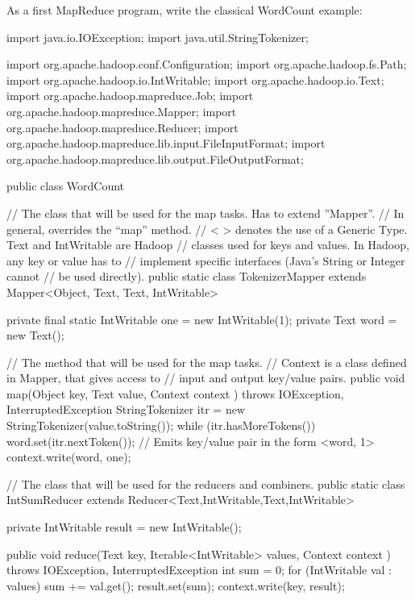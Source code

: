 \documentclass[11pt]{article}
\begin{document}
As a first MapReduce program, write the classical WordCount example:
\begin{java}
  import java.io.IOException;
  import java.util.StringTokenizer;
  
  import org.apache.hadoop.conf.Configuration;
  import org.apache.hadoop.fs.Path;
  import org.apache.hadoop.io.IntWritable;
  import org.apache.hadoop.io.Text;
  import org.apache.hadoop.mapreduce.Job;
  import org.apache.hadoop.mapreduce.Mapper;
  import org.apache.hadoop.mapreduce.Reducer;
  import org.apache.hadoop.mapreduce.lib.input.FileInputFormat;
  import org.apache.hadoop.mapreduce.lib.output.FileOutputFormat;

  public class WordCount {

    // The class that will be used for the map tasks. Has to extend ''Mapper''.
    // In general, overrides the ``map'' method.
    // < > denotes the use of a Generic Type.  Text and IntWritable are Hadoop
    // classes used for keys and values. In Hadoop, any key or value has to
    // implement specific interfaces (Java's String or Integer cannot
    // be used directly). 
    public static class TokenizerMapper
    extends Mapper<Object, Text, Text, IntWritable>{

      private final static IntWritable one = new IntWritable(1);
      private Text word = new Text();

      // The method that will be used for the map tasks.
      // Context is a class defined in Mapper, that gives access to
      // input and output key/value pairs.
      public void map(Object key, Text value, Context context
      ) throws IOException, InterruptedException {
        StringTokenizer itr = new StringTokenizer(value.toString());
        while (itr.hasMoreTokens()) {
          word.set(itr.nextToken());
          // Emits key/value pair in the form <word, 1>
          context.write(word, one);
        }
      }
    }

    // The class that will be used for the reducers and combiners.
    public static class IntSumReducer
    extends Reducer<Text,IntWritable,Text,IntWritable> {
      private IntWritable result = new IntWritable();
      
      public void reduce(Text key, Iterable<IntWritable> values,
      Context context
      ) throws IOException, InterruptedException {
        int sum = 0;
        for (IntWritable val : values) {
          sum += val.get();
        }
        result.set(sum);
        context.write(key, result);
      }
    }

}
\end{java}
\end{document}
